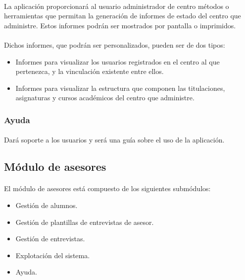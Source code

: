       \paragraph{}La aplicación proporcionará al usuario administrador de centro
      métodos o herramientas que permitan la generación de informes de estado
      del centro que administre. Estos informes podrán ser mostrados por
      pantalla o imprimidos.

      \paragraph{}Dichos informes, que podrán ser personalizados, pueden ser
      de dos tipos:

      \begin{itemize}
       \item Informes para visualizar los usuarios registrados en el centro
             al que pertenezca, y la vinculación existente entre ellos.
       \item Informes para visualizar la estructura que componen las
             titulaciones, asignaturas y cursos académicos del centro que
             administre.
      \end{itemize}

      \subsubsection{Ayuda}

      \paragraph{}Dará soporte a los usuarios y será una guía sobre el uso de
      la aplicación.

   \subsection{Módulo de asesores}

      \paragraph{}El módulo de asesores está compuesto de los siguientes
      submódulos:

      \begin{itemize}
       \item Gestión de alumnos.
       \item Gestión de plantillas de entrevistas de asesor.
       \item Gestión de entrevistas.
       \item Explotación del sistema.
       \item Ayuda.
      \end{itemize}

